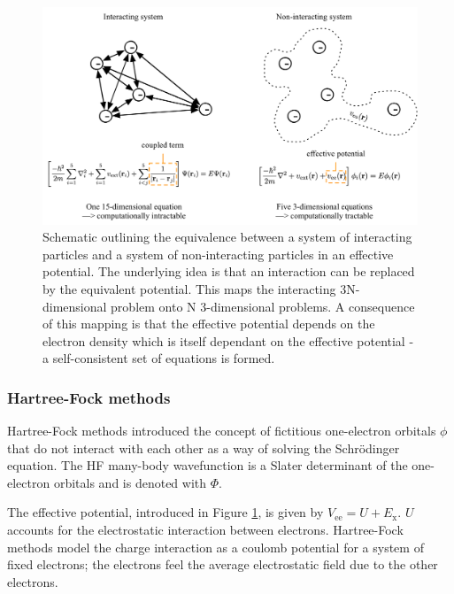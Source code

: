 \begin{figure}[h]
\centering
  \includegraphics[width=1.0\columnwidth]{figures/ch3/decouple.png}
  \caption[Interacting and non-interacting particle systems]{Schematic outlining the equivalence between a system of interacting particles and a system of non-interacting particles in an effective potential. The underlying idea is that an interaction can be replaced by the equivalent potential. This maps the interacting 3N-dimensional problem onto N 3-dimensional problems. A consequence of this mapping is that the effective potential depends on the electron density which is itself dependant on the effective potential - a self-consistent set of equations is formed.} %
  \label{decouple}
\end{figure}

\subsubsection{Hartree-Fock methods}

Hartree-Fock methods introduced the concept of fictitious one-electron orbitals $\phi$ that do not interact with each other as a way of solving the Schr\"{o}dinger equation. The HF many-body wavefunction is a Slater determinant of the one-electron orbitals and is denoted with $\Phi$. 

The effective potential, introduced in Figure \ref{decouple}, is given by $V_{\textrm{ee}} = U + E_{\textrm{x}}$. $U$ accounts for the electrostatic interaction between electrons. Hartree-Fock methods model the charge interaction as a coulomb potential for a system of fixed electrons; the electrons feel the average electrostatic field due to the other electrons.

